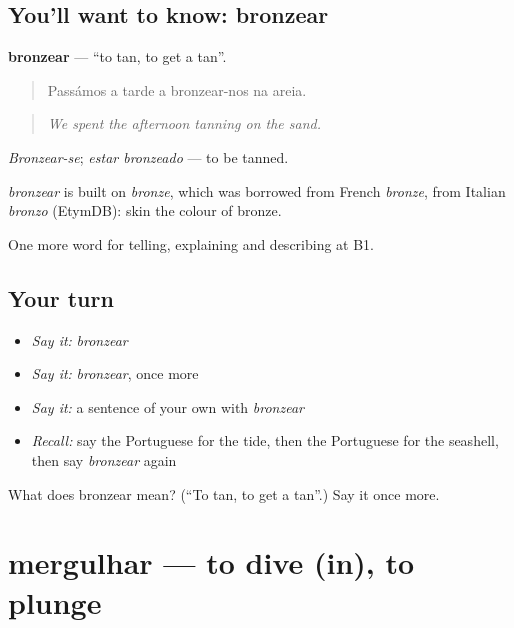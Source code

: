 \subsection*{You'll want to know: bronzear}
\textbf{bronzear} — \textquotedblleft{}to tan, to get a tan\textquotedblright{}.

\begin{quote}
Passámos a tarde a bronzear-nos na areia.
\end{quote}

\begin{quote}
\emph{We spent the afternoon tanning on the sand.}
\end{quote}

\emph{Bronzear-se}; \emph{estar bronzeado} — to be tanned.

\begin{cousinweb}
\emph{bronzear} is built on \emph{bronze}, which was borrowed from French \emph{bronze}, from Italian \emph{bronzo} (EtymDB): skin the colour of bronze.
\end{cousinweb}

\begin{grammarlens}[title={What you've built}]
One more word for telling, explaining and describing at B1.
\end{grammarlens}

\subsection*{Your turn}
\begin{itemize}
\raggedright
  \item \emph{Say it:} \emph{bronzear}
  \item \emph{Say it:} \emph{bronzear}, once more
  \item \emph{Say it:} a sentence of your own with \emph{bronzear}
  \item \emph{Recall:} say the Portuguese for the tide, then the Portuguese for the seashell, then say \emph{bronzear} again
\end{itemize}

\begin{tcolorbox}[breakable,colback=teal!4,colframe=teal!35!black,title={Before you move on}]
What does bronzear mean? (\textquotedblleft{}To tan, to get a tan\textquotedblright{}.) Say it once more.
\end{tcolorbox}
\section[mergulhar]{mergulhar — to dive (in), to plunge}

